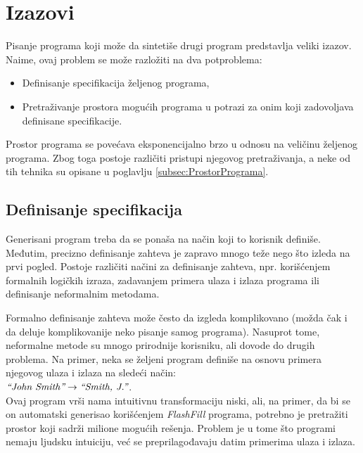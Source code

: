 \section{Izazovi}
\label{sec:Izazovi}

Pisanje programa koji može da sintetiše drugi program predstavlja veliki izazov. Naime, ovaj problem se može razložiti na dva potproblema:

\begin{itemize}
    \item Definisanje specifikacija željenog programa,
    \item Pretraživanje prostora mogućih programa u potrazi za onim koji zadovoljava definisane specifikacije.
\end{itemize}

Prostor programa se povećava eksponencijalno brzo u odnosu na ve\-li\-či\-nu željenog programa. Zbog toga postoje različiti pristupi njegovog pretraživanja, a neke od tih tehnika su opisane u poglavlju \ref{subsec:ProstorPrograma}.

\subsection{Definisanje specifikacija}
\label{subsec:DefinisanjeSpecifikacija}

Generisani program treba da se ponaša na način koji to korisnik definiše. Međutim, precizno definisanje zahteva je zapravo mnogo teže nego što izleda na prvi pogled. Postoje različiti načini za definisanje zahteva, npr. korišćenjem formalnih logičkih izraza, zadavanjem primera ulaza i izlaza programa ili definisanje neformalnim metodama.

Formalno definisanje zahteva može često da izgleda ko\-mpli\-ko\-va\-no (mo\-žda čak i da deluje komplikovanije neko pisanje samog programa). Nasuprot tome, neformalne metode su mnogo prirodnije korisniku, ali dovode do drugih problema. Na primer, neka se željeni program definiše na osnovu primera njegovog ulaza i izlaza na sledeći način: \\
\(\emph{“John Smith”} \rightarrow \emph{“Smith, J.”}\).\\
Ovaj program vrši nama intuitivnu transformaciju niski, ali, na primer, da bi se on automatski generisao korišćenjem \emph{FlashFill} \cite{FlashFill} programa, potrebno je pretražiti prostor koji sadrži milione mogućih rešenja. Problem je u tome što programi nemaju ljudsku intuiciju, već se preprilagođavaju datim primerima ulaza i izlaza.

